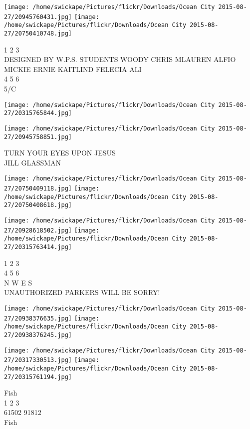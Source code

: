 \documentclass[10pt,letterpaper]{article}
\begin{document}
\texttt{[image: /home/swickape/Pictures/flickr/Downloads/Ocean City 2015-08-27/20945760431.jpg]}
\texttt{[image: /home/swickape/Pictures/flickr/Downloads/Ocean City 2015-08-27/20750410748.jpg]}

1 2 3\\
DESIGNED BY W.P.S. STUDENTS WOODY CHRIS MLAUREN ALFIO MICKIE ERNIE KAITLIND FELECIA ALI\\
4 5 6\\
5/C\\
\pagebreak

\texttt{[image: /home/swickape/Pictures/flickr/Downloads/Ocean City 2015-08-27/20315765844.jpg]}

\vspace{0.25in}
\texttt{[image: /home/swickape/Pictures/flickr/Downloads/Ocean City 2015-08-27/20945758851.jpg]}

TURN YOUR EYES UPON JESUS\\
JILL GLASSMAN\\
\pagebreak

\texttt{[image: /home/swickape/Pictures/flickr/Downloads/Ocean City 2015-08-27/20750409118.jpg]}
\texttt{[image: /home/swickape/Pictures/flickr/Downloads/Ocean City 2015-08-27/20750408618.jpg]}

\texttt{[image: /home/swickape/Pictures/flickr/Downloads/Ocean City 2015-08-27/20928618502.jpg]}
\texttt{[image: /home/swickape/Pictures/flickr/Downloads/Ocean City 2015-08-27/20315763414.jpg]}

1 2 3\\
4 5 6\\
N W E S\\
UNAUTHORIZED PARKERS WILL BE SORRY!\\
\pagebreak

\texttt{[image: /home/swickape/Pictures/flickr/Downloads/Ocean City 2015-08-27/20938376635.jpg]}
\texttt{[image: /home/swickape/Pictures/flickr/Downloads/Ocean City 2015-08-27/20938376245.jpg]}

\texttt{[image: /home/swickape/Pictures/flickr/Downloads/Ocean City 2015-08-27/20317330513.jpg]}
\texttt{[image: /home/swickape/Pictures/flickr/Downloads/Ocean City 2015-08-27/20315761194.jpg]}

Fish\\
1 2 3\\
61502 91812\\
Fish\\
\pagebreak
\end{document}
